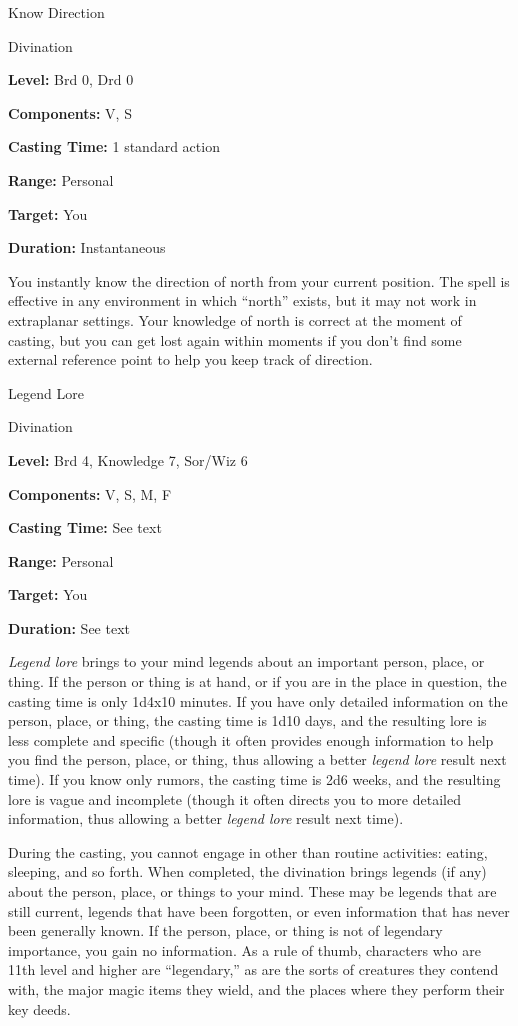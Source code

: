 \documentclass{article}
\begin{document}
\vspace{12pt}
Know Direction

Divination

\textbf{Level:} Brd 0, Drd 0

\textbf{Components:} V, S

\textbf{Casting Time:} 1 standard action

\textbf{Range:} Personal

\textbf{Target:} You

\textbf{Duration:} Instantaneous

You instantly know the direction of north from your current position. The spell 
is effective in any environment in which ``north'' exists, but it may not work 
in extraplanar settings. Your knowledge of north is correct at the moment of casting, 
but you can get lost again within moments if you don't find some external reference 
point to help you keep track of direction.

\vspace{12pt}
Legend Lore

Divination

\textbf{Level:} Brd 4, Knowledge 7, Sor/Wiz 6

\textbf{Components:} V, S, M, F

\textbf{Casting Time:} See text

\textbf{Range:} Personal

\textbf{Target:} You

\textbf{Duration:} See text

\textit{Legend lore }brings to your mind legends about an important person, place, 
or thing. If the person or thing is at hand, or if you are in the place in question, 
the casting time is only 1d4x10 minutes. If you have only detailed information 
on the person, place, or thing, the casting time is 1d10 days, and the resulting 
lore is less complete and specific (though it often provides enough information 
to help you find the person, place, or thing, thus allowing a better \textit{legend 
lore }result next time). If you know only rumors, the casting time is 2d6 weeks, 
and the resulting lore is vague and incomplete (though it often directs you to 
more detailed information, thus allowing a better \textit{legend lore }result next 
time).

During the casting, you cannot engage in other than routine activities: eating, 
sleeping, and so forth. When completed, the divination brings legends (if any) 
about the person, place, or things to your mind. These may be legends that are 
still current, legends that have been forgotten, or even information that has never 
been generally known. If the person, place, or thing is not of legendary importance, 
you gain no information. As a rule of thumb, characters who are 11th level and 
higher are ``legendary,'' as are the sorts of creatures they contend with, the 
major magic items they wield, and the places where they perform their key deeds.
\end{document}
